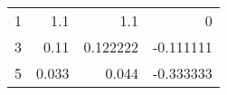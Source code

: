 \begin{tabular}{rrrr}
\hline
 1 & 1.1   & 1.1      &  0        \\
 3 & 0.11  & 0.122222 & -0.111111 \\
 5 & 0.033 & 0.044    & -0.333333 \\
\hline
\end{tabular}